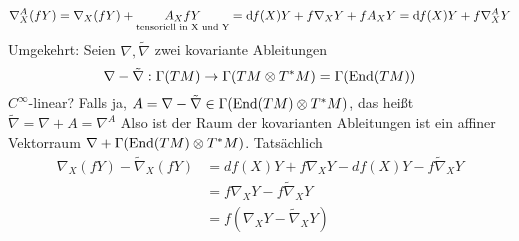 \begin{enumerate}[(i)]
\[
\nabla_X^A(fY)=\nabla_X(fY) + \underset{\text{tensoriell in X und Y}}{A_X fY}=\mathrm{d}\mkern-1.0mu f(X)Y+f\nabla_X Y + f A_X Y = \mathrm{d}\mkern-1.0mu f(X)Y + f\nabla_X^AY
\]
Umgekehrt: Seien $\nabla,\tilde{\nabla}$ zwei kovariante Ableitungen 
\[\nabla-\tilde{\nabla}:\Gamma(TM)\to\Gamma(TM\otimes T^*M)=\Gamma(\operatorname{End}(TM))\]
$C^\infty$-linear? Falls ja, $A = \nabla-\tilde{\nabla}\in \Gamma(\operatorname{End}(TM)\otimes T^* M)$, das heißt $\tilde{\nabla}=\nabla + A = \nabla^A$
Also ist der Raum der kovarianten Ableitungen ist ein affiner Vektorraum $\nabla+\Gamma(\operatorname{End}(TM)\otimes T^* M)$.
Tatsächlich 
\begin{align*}
\nabla_X(fY) - \tilde{\nabla}_X(fY) &= df(X)Y+f\nabla_XY-df(X)Y-f\tilde{\nabla}_XY\\
&= f\nabla_X Y - f\tilde{\nabla}_X Y\\
&= f(\nabla_X Y-\tilde{\nabla}_X Y)
\end{align*}
\end{enumerate}

